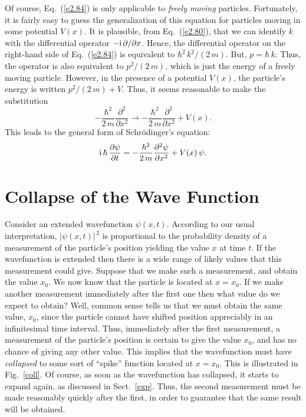 Of course, Eq.~(\ref{e2.84}) is only applicable to {\em freely
moving} particles. Fortunately, it is fairly easy to guess the generalization of this
equation for particles moving in some potential $V(x)$. It is plausible, from Eq.~(\ref{e2.80}),  that we can identify
$k$ with the differential operator $-{\rm i}\,\partial/\partial x$. 
Hence, the differential operator on the right-hand side of Eq.~(\ref{e2.84})
is equivalent to $\hbar^2\,k^2/(2\,m)$. But, $p = \hbar\,k$. Thus,
the operator is also equivalent to $p^2/(2\,m)$, which is just the energy of
a freely moving particle. However, in the presence of a potential
$V(x)$, the particle's energy is written $p^2/(2\,m) + V$. Thus, it
seems reasonable to make the substitution
\begin{equation}
-\frac{\hbar^2}{2\,m}\frac{\partial^2}{\partial x^2}\rightarrow
-\frac{\hbar^2}{2\,m}\frac{\partial^2}{\partial x^2} + V(x).
\end{equation}
This leads to the general form of Schr\"{o}dinger's equation:
\begin{equation}
{\rm i}\,\hbar\,\frac{\partial\psi}{\partial t} = -\frac{\hbar^2}{2\,m}\frac{\partial^2\psi}{\partial x^2} + V(x)\,\psi.
\end{equation}

\section{Collapse of the Wave Function}\label{scoll}
Consider an extended wavefunction $\psi(x,t)$. According to our
usual interpretation, $|\psi(x,t)|^{\,2}$ is proportional to the
probability density of a measurement of the particle's position yielding the
value $x$ at time $t$. If the wavefunction is extended then there is a wide
range of likely values that this  measurement could give. 
Suppose that we make such a measurement, and obtain the value $x_0$.
We now know that the particle is located at $x=x_0$.  
If we make another measurement immediately after the first one then
what value do we expect to obtain? Well, common sense tells us that
we must obtain the same value, $x_0$, since the particle
cannot have shifted position appreciably in an infinitesimal  time interval. 
Thus, immediately after the first measurement, a measurement of
the particle's position is certain to give the value $x_0$, and has
no chance of giving any other value. This implies that the
wavefunction must have {\em collapsed}\/ to some sort of  ``spike'' function
located at $x=x_0$. This is illustrated in Fig.~\ref{coll}.
Of course, as soon as the wavefunction has collapsed, it starts to
expand again, as discussed in Sect.~\ref{exp}. Thus, the second measurement
must be made reasonably quickly after the first, in order to guarantee that the
same result will be obtained.

